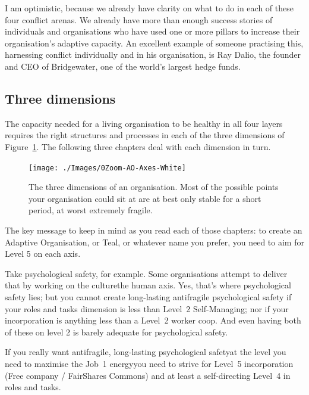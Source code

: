 I am optimistic, because we already have clarity on what to do in each of these four conflict arenas. We already have more than enough success stories of individuals and organisations who have used one or more pillars to increase their organisation’s adaptive capacity. An excellent example of someone practising this, harnessing conflict individually and in his organisation, is Ray Dalio\cite{dalio-principles},  the founder and CEO of Bridgewater, one of the world's largest hedge funds. 


\subsection{Three dimensions}
The capacity needed for a living organisation to be healthy in all four layers requires the right structures and processes in each of the three dimensions of Figure~\ref{figure:three-axes}. The following three chapters deal with each dimension in turn.


\begin{figure}[htb]
\begin{center}
\texttt{[image: ./Images/0Zoom-AO-Axes-White]}
\end{center}
\caption[The three dimensions of an organisation]{The three dimensions of an organisation. Most of the possible points your organisation could sit at are at best only stable for a short period, at worst extremely fragile.}
\label{figure:three-axes}
\end{figure}


The key message to keep in mind as you read each of those chapters: to create an Adaptive Organisation,  or Teal,  or whatever name you prefer, you need to aim for Level 5 on each axis. 


Take psychological safety, for example. Some organisations attempt to deliver that by working on the culture\textemdash the human axis. Yes, that’s where psychological safety lies; but you cannot create long-lasting antifragile psychological safety  if your roles and tasks dimension is less than Level~2 Self-Managing; nor if your incorporation is anything less than a Level~2 worker coop. And even having both of these on level 2 is barely adequate for psychological safety. 


If you really want antifragile, long-lasting psychological safety\textemdash at the level you need to maximise the Job~1 energy\textemdash you need to strive for Level~5 incorporation (Free company / FairShares Commons) and at least a self-directing Level~4 in roles and tasks. 


